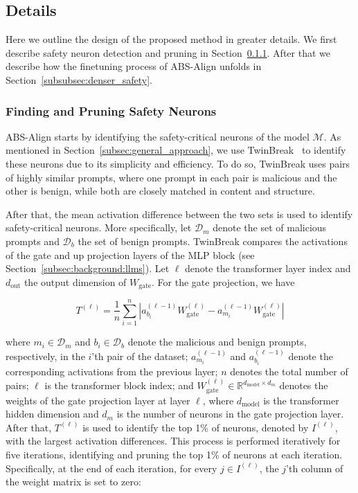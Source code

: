 \subsection{\method Details}
\label{subsec:method}

Here we outline the design of the proposed method in greater details. We first describe safety neuron detection and pruning in Section~\ref{subsubsec:finding_and_pruning}. After that we describe how the finetuning process of ABS-Align unfolds in Section~\ref{subsubsec:denser_safety}.

\subsubsection{Finding and Pruning Safety Neurons}
\label{subsubsec:finding_and_pruning}
ABS-Align starts by identifying the safety-critical neurons of the model $\mathcal{M}$. As mentioned in Section~\ref{subsec:general_approach}, we use TwinBreak~\cite{twinbreak} to identify these neurons due to its simplicity and efficiency. To do so, TwinBreak uses pairs of highly similar prompts, where one prompt in each pair is malicious and the other is benign, while both are closely matched in content and structure.

After that, the mean activation difference between the two sets is used to identify safety-critical neurons. More specifically, let $\mathcal{D}_m$ denote the set of malicious prompts and $\mathcal{D}_b$ the set of benign prompts. TwinBreak compares the activations of the gate and up projection layers of the MLP block (see Section~\ref{subsec:background:llms}). Let $\ell$ denote the transformer layer index and $d_\text{out}$ the output dimension of $W_\text{gate}$. For the gate projection, we have

\begin{equation}
\label{eq:twinbreak_score}
    T^{(\ell)} = \frac{1}{n}\sum_{i=1}^{n} \left|a^{(\ell-1)}_{b_i} W_\text{gate}^{(\ell)} - a^{(\ell-1)}_{m_i} W_\text{gate}^{(\ell)}\right|
\end{equation}

where $m_i \in \mathcal{D}_m$ and $b_i \in \mathcal{D}_b$ denote the malicious and benign prompts, respectively, in the $i$'th pair of the dataset; $a^{(\ell-1)}_{m_i}$ and $a^{(\ell-1)}_{b_i}$ denote the corresponding activations from the previous layer; $n$ denotes the total number of pairs; $\ell$ is the transformer block index; and $W_\text{gate}^{(\ell)} \in \mathbb{R}^{d_\text{model} \times d_m}$ denotes the weights of the gate projection layer at layer $\ell$, where $d_\text{model}$ is the transformer hidden dimension and $d_m$ is the number of neurons in the gate projection layer. After that, $T^{(\ell)}$ is used to identify the top 1\% of neurons, denoted by $I^{(\ell)}$, with the largest activation differences. This process is performed iteratively for five iterations, identifying and pruning the top 1\% of neurons at each iteration. Specifically, at the end of each iteration, for every $j \in I^{(\ell)}$, the $j$'th column of the weight matrix is set to zero:

